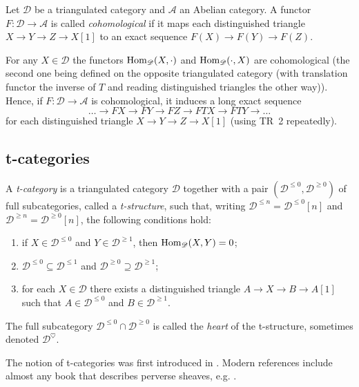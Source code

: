 \documentclass[english]{short-notes}
\renewcommand\cat{\mathscr}
\begin{document}
\begin{Def}
    Let $\cat D$ be a triangulated category and $\cat A$ an Abelian category.
    A functor $F\colon \cat D → \cat A$ is called \emph{cohomological} if it maps each distinguished triangle $X → Y → Z → X[1]$ to an exact sequence $F(X) → F(Y) → F(Z)$.
\end{Def}

\begin{Ex}
    For any $X ∈ \cat D$ the functors $\Hom_{\cat D}(X,\cdot)$ and $\Hom_{\cat D}(\cdot, X)$  are cohomological (the second one being defined on the opposite triangulated category (with translation functor the inverse of $T$ and reading distinguished triangles the other way)).
    Hence, if $F\colon \cat D → \cat A$ is cohomological, it induces a long exact sequence
    \[
    \dotsc → FX → FY → FZ → FTX → FTY → \dotsc
    \]
    for each distinguished triangle $X → Y → Z → X[1]$ (using TR~2 repeatedly).
\end{Ex}

\subsection{t-categories}

\begin{Def}
    A \emph{t-category} is a triangulated category $\cat D$ together with a pair $(\cat D^{≤0},\cat D^{≥0})$ of full subcategories, called a \emph{t-structure}, such that, writing $\cat D^{≤n} = \cat D^{≤0}[n]$ and $\cat D^{≥n} = \cat D^{≥0}[n]$, the following conditions hold:
    \begin{enumerate}
        \item if $X ∈ \cat D^{≤0}$ and $Y ∈ \cat D^{≥1}$, then $\Hom_{\cat D}(X,Y) = 0$;
        \item $\cat D^{≤0} ⊆ \cat D^{≤1}$ and $\cat D^{≥0} ⊇ \cat D^{≥1}$;
        \item for each $X ∈ \cat D$ there exists a distinguished triangle $A → X → B → A[1]$ such that $A ∈ \cat D^{≤0}$ and $B ∈ \cat D^{≥1}$.
    \end{enumerate}

    The full subcategory $\cat D^{≤0} ∩ \cat D^{≥0}$ is called the \emph{heart} of the t-structure, sometimes denoted $\cat D^\heartsuit$.
\end{Def}

The notion of t-categories was first introduced in \cite{BeilinsonBernsteinDeligne:1982:FaisceauxPervers}.
Modern references include almost any book that describes perverse sheaves, e.g. \cite{HottaTakeuchiTanisaki:2008:DModulesPerverseSheavesRepresentationTheory, PetersSteenbrink:2008:MixedHodgeStructures, KashiwaraSchapira:1994:SheavesOnManifolds}.
\end{document}
